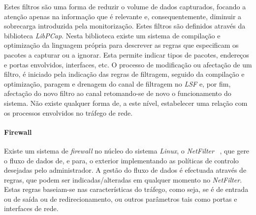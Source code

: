 \documentclass[a4paper]{llncs}
\newcommand{\td}[1]{\todo[inline]{#1}}
\begin{document}



Estes filtros são uma forma de reduzir o volume de dados capturados, focando a atenção apenas na informação que é relevante e, consequentemente, diminuir a sobrecarga introduzida pela monitorização.
 Estes filtros são definidos através da biblioteca \textit{LibPCap}.
 Nesta biblioteca existe um sistema de compilação e optimização da linguagem própria para descrever as regras que especificam os pacotes a capturar ou a ignorar.
 Esta permite indicar tipos de pacotes, endereços e portas envolvidos, interfaces, etc.
 O processo de modificação ou afectação de um filtro, é iniciado pela indicação das regras de filtragem, seguido da compilação e optimização, paragem e drenagem do canal de filtragem no \textit{LSF} e, por fim, afectação do novo filtro ao canal retomando-se de novo o funcionamento do sistema.
 Não existe qualquer forma de, a este nível, estabelecer uma relação com os processos envolvidos no tráfego de rede.


\paragraph{Firewall\\}

Existe um sistema de \textit{firewall} no núcleo do sistema \textit{Linux}, o \textit{NetFilter} ~\cite{netfiltersite}, que gere o fluxo de dados de, e para, o exterior implementando as políticas de controlo desejadas pelo administrador.
 A gestão do fluxo de dados é efectuada através de regras, que podem ser indicadas/alteradas em qualquer momento no \textit{NetFilter}.
 Estas regras baseiam-se nas características do tráfego, como seja, se é de entrada ou de saída ou de redirecionamento, ou outros parâmetros tais como portas e interfaces de rede.
\end{document}
